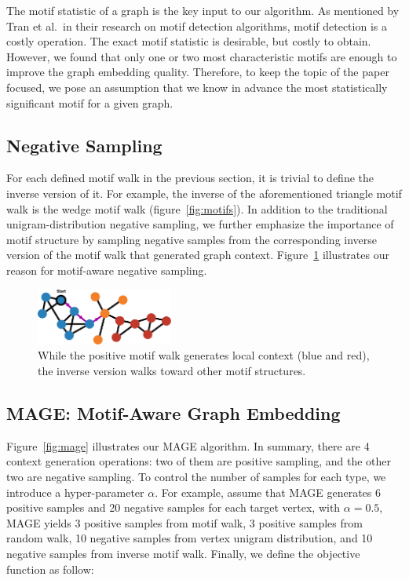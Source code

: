 \documentclass[letterpaper]{article}
\begin{document}
            The motif statistic of a graph is the key input to our algorithm. As mentioned by Tran et al.\ in
            their research on motif detection algorithms, motif detection is a costly operation. The
            exact motif statistic is desirable, but costly to obtain. However, we found that only one or 
            two most characteristic motifs are enough to improve the graph embedding quality. Therefore, 
            to keep the topic of the paper focused, we pose an assumption that we know in advance the most
            statistically significant motif for a given graph. 

        \subsection{Negative Sampling}

            For each defined motif walk in the previous section, it is trivial to define the inverse version
            of it. For example, the inverse of the aforementioned triangle motif walk is the wedge motif
            walk (figure~\ref{fig:motifs}). In addition to the traditional unigram-distribution negative
            sampling, we further emphasize the importance of motif structure by sampling negative samples
            from the corresponding inverse version of the motif walk that generated graph context. 
            Figure~\ref{fig:mneg} illustrates our reason for motif-aware negative sampling.

            \begin{figure}
                \centering
                \includegraphics[width=0.4\textwidth]{fig6_mneg}
                \caption{While the positive motif walk generates local context (blue and red), the inverse version walks toward other motif structures.}
                \label{fig:mneg}
            \end{figure}

        \subsection{MAGE: Motif-Aware Graph Embedding}

            Figure~\ref{fig:mage} illustrates our MAGE algorithm. In summary, 
            there are 4 context generation operations: two of them are positive sampling, and the other
            two are negative sampling. To control the number of samples for each type, we introduce a 
            hyper-parameter $\alpha$. For example, assume that MAGE generates 6 positive samples and 
            20 negative samples for each target vertex, with $\alpha=0.5$, MAGE yields 3 positive samples 
            from motif walk, 3 positive samples from random walk, 10 negative samples from vertex unigram
            distribution, and 10 negative samples from inverse motif walk.  Finally, we define the 
            objective function as follow:
\end{document}
